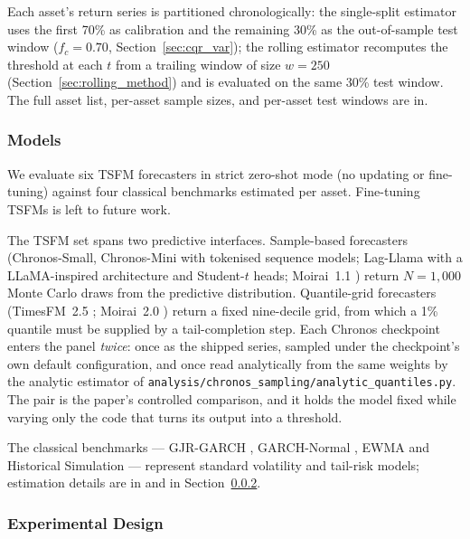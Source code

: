 \documentclass[preprint,11pt,authoryear]{elsarticle}
\newcommand{\1}{\boldsymbol{1}}
\begin{document}
Each asset's return series is partitioned chronologically: the single-split estimator uses the first 70\% as calibration and the remaining 30\% as the out-of-sample test window ($f_c = 0.70$, Section~\ref{sec:cqr_var}); the rolling estimator recomputes the threshold at each $t$ from a trailing window of size $w = 250$ (Section~\ref{sec:rolling_method}) and is evaluated on the same 30\% test window. The full asset list, per-asset sample sizes, and per-asset test windows are in.

\subsubsection{Models}
\label{sec:models}

We evaluate six TSFM forecasters in strict zero-shot mode (no updating or fine-tuning) against four classical benchmarks estimated per asset. Fine-tuning TSFMs is left to future work.

The TSFM set spans two predictive interfaces. Sample-based forecasters (Chronos-Small, Chronos-Mini \citep{ansari2024chronos,ansari2025chronos2} with tokenised sequence models; Lag-Llama \citep{rasul2024lagllama} with a LLaMA-inspired architecture and Student-$t$ heads; Moirai~1.1 \citep{woo2024moirai}) return $N = 1{,}000$ Monte Carlo draws from the predictive distribution. Quantile-grid forecasters (TimesFM~2.5 \citep{das2024timesfm}; Moirai~2.0 \citep{liu2025moirai}) return a fixed nine-decile grid, from which a 1\% quantile must be supplied by a tail-completion step. Each Chronos checkpoint enters the panel \emph{twice}: once as the shipped series, sampled under the checkpoint's own default configuration, and once read analytically from the same weights by the analytic estimator of \texttt{analysis/chronos\_sampling/analytic\_quantiles.py}. The pair is the paper's controlled comparison, and it holds the model fixed while varying only the code that turns its output into a threshold.

The classical benchmarks --- GJR-GARCH \citep{glosten1993relation}, GARCH-Normal \citep{bollerslev1986generalized}, EWMA \citep{riskmetrics1996} and Historical Simulation --- represent standard volatility and tail-risk models; estimation details are in and in Section~\ref{sec:exp_design}.

\subsubsection{Experimental Design}
\label{sec:exp_design}
\end{document}
